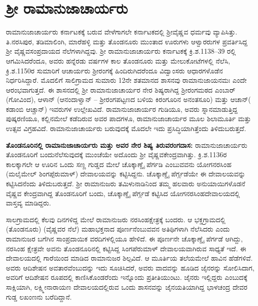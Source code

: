 \section{ಶ‍್ರೀ ರಾಮಾನುಜಾಚಾರ್ಯರು}

ರಾಮಾನುಜಾಚಾರ್ಯರು ಕರ್ನಾಟಕಕ್ಕೆ ಬರುವ ವೇಳೆಗಾಗಲೇ ಕರ್ನಾಟಕದಲ್ಲಿ ಶ‍್ರೀವೈಷ್ಣವ ಧರ್ಮವು ವ್ಯಾಪಿಸಿತ್ತು. ತಿ.ನರಸಿಪುರ, ತಡಿಮಾಲಿಂಗಿ, ಮಾರೆಹಳ್ಳಿ ಮತ್ತು ತೊಂಡನೂರು ಮುಂತಾದ ಊರುಗಳು ಆಳ್ವಾರರುಗಳ ಪ್ರವರ್ತಿಸಿದ್ದ ಶ‍್ರೀ ವೈಷ್ಣವಸಂಪ್ರದಾಯದ ನೆಲೆಗಳಾಗಿದ್ದವು. ಶ‍್ರೀ ರಾಮಾನುಜಾಚಾರ್ಯರು ಕರ್ನಾಟಕಕ್ಕೆ ಕ್ರಿ.ಶ.1138–39 ರಲ್ಲಿ ಆಗಮಿಸಿದರೆಂದೂ, ಅವರು ಹನ್ನೆರಡು ವರ್ಷಗಳ ಕಾಲ ತೊಂಡನೂರು ಮತ್ತು ಮೇಲುಕೋಟೆಗಳಲ್ಲಿ ನೆಲೆಸಿ, ಕ್ರಿ.ಶ.1150ರ ಸುಮಾರಿಗೆ ಆಚಾರ್ಯರು ಶ‍್ರೀರಂಗಕ್ಕೆ ಹಿಂದಿರುಗಿದರೆಂದೂ ವಿದ್ವಾಂಸರು ಆಧಾರಗಳೊಡೆನ ನಿರ್ಧರಿಸಿದ್ದಾರೆ. ಮೊದಲಿಗೆ ಸಾಲಿಗ್ರಾಮದ ಸುಮಾರು 12ನೇ ಶತಮಾನದ ಶಾಸನವು ರಾಮಾನುಜಾಯನಮಃ ಎಂದೇ ಆರಂಭವಾಗುತ್ತದೆ. ಈ ಶಾಸನದಲ್ಲಿ ಶ‍್ರೀ ರಾಮಾನುಜಾಚಾರ್ಯರ ನೇರ ಶಿಷ್ಯರಾಗಿದ್ದ ಶ‍್ರೀರಂಗಮಠದ ಎಂಬಾರ್​(ಗೋವಿಂದ), ಆಳಾನ್​ (ಆನಂದಾಳ್ವಾನ್​ – ಶ‍್ರೀರಂಗಪಟ್ಟಣದ ಬಳಿಯ ಕಿರಂಗೂರಿನ ಅನಂತಸೂರಿ) ಮತ್ತು ಆಚಾನ್​( ಕಡಾಂಬಿ ಆಚ್ಚಾನ್​) ಇವರುಗಳ ಉಲ್ಲೇಖವಿದೆ. ರಾಮಾನುಜಾಚಾರ್ಯರ ಗುಡಿಯೂ, ಅವರು ಸ್ನಾನಮಾಡುತ್ತಿದ್ದ ಪುಷ್ಕರಣಿಯೂ, ಕಲ್ಲಿನಮೇಲೆ ಕಡೆದಿರುವ ಅವರ ಪಾದಗಳೂ, ರಾಮಾನುಜಾಚಾರ್ಯರ ಮೂಲ ಶಿಲಾಮೂರ್ತಿ ಮತ್ತು ಉತ್ಸವ ವಿಗ್ರಹವಿದೆ. ರಾಮಾನುಜಾಚಾರ್ಯರು ಬರುವುದಕ್ಕೆ ಮೊದಲೇ ಇದು ಪ್ರಸಿದ್ಧಿಯಾಗಿತ್ತೆಂದು ತಿಳಿದುಬರುತ್ತದೆ.

\textbf{ತೊಂಡನೂರಿನಲ್ಲಿ ರಾಮಾನುಜಾಚಾರ್ಯರು ಮತ್ತು ಅವರ ನೇರ ಶಿಷ್ಯ ತಿರುವರಂಗದಾಸ:} ರಾಮಾನುಜಾಚಾರ್ಯರು ತೊಂಡನೂರಿಗೆ ಬಂದುನೆಲೆಸುವುದಕ್ಕೆ ಮುಂಚೆಯೇ ಅದೊಂದು ಶ‍್ರೀ ವೈಷ್ಣವಕೇಂದ್ರವಾಗಿತ್ತು. ಕ್ರಿ.ಶ.1136ರ ಕಾಲಕ್ಕಾಗಲೇ ಆ ಊರಿನ ಒಂದು ಸಣ್ಣ ಗುಡ್ಡದ ಮೇಲೆ ಚೊಕ್ಕಾಣ್ಡೈ ಪೆರ್ಗಡಿ ಎಂಬುವವನು ಯೋಗನರಸಿಂಹ (ಮಲೈಮೇಲ್​ ಶಿಂಗಪ್ಪೆರುಮಾಳ್​) ದೇವಾಲಯವನ್ನು ಕಟ್ಟಿಸಿದ್ದನು. ಚೊಕ್ಕಾಣ್ಡೈ ಪೆರ್ಗ್ಗಡೆಯೇ ಈ ದೇವಾಲಯವನ್ನು ಕಟ್ಟಿಸಿದನೆಂದು ತಿಳಿದುಬರುತ್ತದೆ. ಶ‍್ರೀ ರಾಮಾನುಜರು ತಮಿಳುನಾಡಿನಿಂದ ತಮ್ಮ ಹಲವಾರು ಅನುಯಾಯಿಗಳೊಡನೆ ವೈಷ್ಣವ ಕೇಂದ್ರವಾಗಿದ್ದ ತೊಂಡನೂರಿಗೆ ಬಂದು, ಚೊಕ್ಕಾಣ್ಡೈ ಪೆರ್ಗ್ಗಡೆ ಕಟ್ಟಿಸಿದ ಯೋಗನರಸಿಂಹದೇವಾಲಯದಲ್ಲಿ ವಾಸ್ತವ್ಯ ಮಾಡಿದ್ದರು.

ಸಾಲಗ್ರಾಮದಲ್ಲಿ ಕೆಲವು ದಿನಗಳಿದ್ದ ಮೇಲೆ ರಾಮಾನುಜರು ನರಸಿಂಹಕ್ಷೇತ್ರಕ್ಕೆ ಬಂದರು. ಆ ಭಕ್ತಗ್ರಾಮದಲ್ಲಿ (ತೊಂಡನೂರು) (ವೈಷ್ಣವರ ನೆಲೆ) ಮಹಾಭಕ್ತನಾದ ಪೂರ್ಣನೆಂಬುವವನ ಅತಿಥಿಗಳಾಗಿ ನೆಲೆಸಿದರು ಎಂದು ರಾಮಾನುಜರ ಬಗೆಗಿನ ಸಾಂಪ್ರದಾಯಿಕ ವರದಿಗಳಲ್ಲಿಯೂ ಹೇಳಿದೆ. ಈ ಪೂರ್ಣನೇ ಚೊಕ್ಕಾಣ್ಡೈ ಪೆರ್ಗಡೆ ಆಗಿದ್ದು, ನರಸಿಂಹ ಕ್ಷೇತ್ರವೇ ಅವನು ತೊಂಡನೂರಿನಲ್ಲಿ ಕಟ್ಟಿಸಿದ್ದ ಸಿಂಗಪೆರುಮಾಳ್​ ದೇವಾಲಯವಾಗಿರುವ ಸಾಧ್ಯತೆ ಇದೆ. ಈ ದೇವಾಲಯದಲ್ಲಿ ಗಾರೆಯಿಂದ ಮಾಡಿದ ರಾಮಾನುಜರ ಶಿಲ್ಪವಿದೆ. ಆ ಮೂರ್ತಿಯ ತಲೆಯಮೇಲೆ ಹಾವಿನ ಹೆಡೆಗಳಿವೆ. ಅವರು ಆದಿಶೇಷನ ಅವತಾರವೆಂಬುದನ್ನು ಇದು ಸೂಚಿಸಿದರೆ, ಅವರು ವಾದವನ್ನು ಹೂಡಿದ ಜೈನರನ್ನು ಸೋಲಿಸಿದಾಗ, ಅವರಿಗೆ ಆದಿಶೇಷನ ರೂಪದಲ್ಲಿ ಕಾಣಿಸಿಕೊಂಡರೆಂದು ಇನ್ನೊಂದು ಪ್ರತೀತಿಯುಂಟು. ಜೈನರು ಇಲ್ಲಿದ್ದರು ಎಂಬುದಕ್ಕೆ ಸಾಕ್ಷಿಯಾಗಿ, ಲಕ್ಷ್ಮೀನಾರಾಯಣ ದೇವಾಲಯದಲ್ಲಿರುವ ಒಂದು ಶಾಸನವನ್ನು ಜೈನಯತಿಯಾಗಿದ್ದ ಭಾಳಚಂದ್ರ ದೇವರ ಗುಡ್ಡ ಲಖಂಣನು ಬರೆದಿದ್ದಾನೆ.

